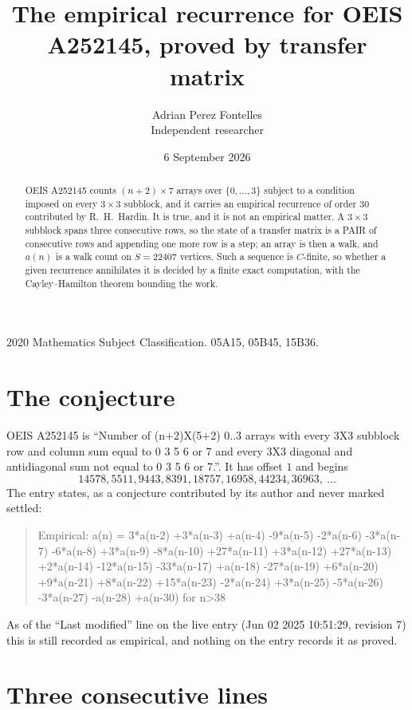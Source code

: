 \documentclass[11pt,a4paper]{article}
\title{The empirical recurrence for OEIS A252145, proved by transfer matrix}
\author{Adrian Perez Fontelles\\ \small Independent researcher}
\date{6 September 2026}
\theoremstyle{plain}
\theoremstyle{definition}
\begin{document}
\maketitle

\begin{abstract}
OEIS A252145 counts $(n+2)\times7$ arrays over $\{0,\dots,3\}$ subject to a condition imposed on
every $3\times3$ subblock, and it carries an empirical recurrence of order $30$
contributed by R.~H.~Hardin. It is true, and it is not an empirical matter. A $3\times3$
subblock spans three consecutive rows, so the state of a transfer matrix is a PAIR of
consecutive rows and appending one more row is a step; an array is then a walk, and
$a(n)$ is a walk count on $S=22407$ vertices. Such a sequence is $C$-finite, so whether a given
recurrence annihilates it is decided by a finite exact computation, with the Cayley--Hamilton
theorem bounding the work.
\end{abstract}

\noindent\small 2020 Mathematics Subject Classification. 05A15, 05B45, 15B36.\normalsize

\section{The conjecture}

OEIS A252145 is ``Number of (n+2)X(5+2) 0..3 arrays with every 3X3 subblock row and column sum equal to 0 3 5 6 or 7 and every 3X3 diagonal and antidiagonal sum not equal to 0 3 5 6 or 7.''. It has offset $1$ and begins
\[
14578, 5511, 9443, 8391, 18757, 16958, 44234, 36963,\ \dots
\]
The entry states, as a conjecture contributed by its author and never marked settled:
\begin{quote}
Empirical: a(n) = 3*a(n-2) +3*a(n-3) +a(n-4) -9*a(n-5) -2*a(n-6) -3*a(n-7) -6*a(n-8) +3*a(n-9) -8*a(n-10) +27*a(n-11) +3*a(n-12) +27*a(n-13) +2*a(n-14) -12*a(n-15) -33*a(n-17) +a(n-18) -27*a(n-19) +6*a(n-20) +9*a(n-21) +8*a(n-22) +15*a(n-23) -2*a(n-24) +3*a(n-25) -5*a(n-26) -3*a(n-27) -a(n-28) +a(n-30) for n>38
\end{quote}
As of the ``Last modified'' line on the live entry (Jun 02 2025 10:51:29, revision 7) this is still
recorded as empirical, and nothing on the entry records it as proved.

\section{Three consecutive lines}
\end{document}
